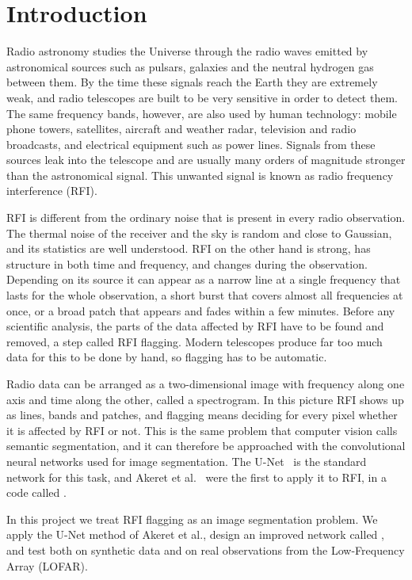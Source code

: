\chapter{Introduction}
\label{ch:intro}
Radio astronomy studies the Universe through the radio waves emitted by
astronomical sources such as pulsars, galaxies and the neutral hydrogen gas
between them. By the time these signals reach the Earth they are extremely
weak, and radio telescopes are built to be very sensitive in order to detect
them. The same frequency bands, however, are also used by human technology:
mobile phone towers, satellites, aircraft and weather radar, television and
radio broadcasts, and electrical equipment such as power lines. Signals from
these sources leak into the telescope and are usually many orders of
magnitude stronger than the astronomical signal. This unwanted signal is known
as radio frequency interference (RFI).

RFI is different from the ordinary noise that is present in every radio
observation. The thermal noise of the receiver and the sky is random and close
to Gaussian, and its statistics are well understood. RFI on the other hand is
strong, has structure in both time and frequency, and changes during the
observation. Depending on its source it can appear as a narrow line at a single
frequency that lasts for the whole observation, a short burst that covers
almost all frequencies at once, or a broad patch that appears and fades within
a few minutes. Before any scientific analysis, the parts of the data affected
by RFI have to be found and removed, a step called RFI flagging. Modern
telescopes produce far too much data for this to be done by hand, so flagging
has to be automatic.

Radio data can be arranged as a two-dimensional image with frequency along one
axis and time along the other, called a spectrogram. In this picture RFI shows
up as lines, bands and patches, and flagging means deciding for every pixel
whether it is affected by RFI or not. This is the same problem that computer
vision calls semantic segmentation, and it can therefore be approached with the
convolutional neural networks used for image segmentation. The
U-Net~\cite{ronneberger2015} is the standard network for this task, and
Akeret et al.~\cite{akeret2017} were the first to apply it to RFI, in a code
called \tfunet{}.

In this project we treat RFI flagging as an image segmentation problem. We
apply the U-Net method of Akeret et al., design an improved network called
\hybrid{}, and test both on synthetic data and on real observations from the
Low-Frequency Array (LOFAR).


